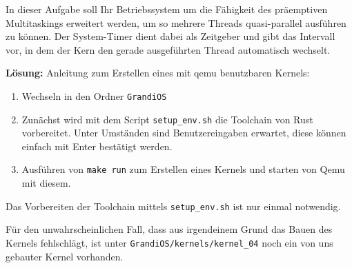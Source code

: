 \begin{description}

In  dieser  Aufgabe  soll  Ihr  Betriebssystem  um  die  Fähigkeit  des  präemptiven  Multitaskings erweitert  werden,  um  so  mehrere  Threads  quasi-parallel  ausführen  zu  können.  Der  System-Timer dient  dabei  als  Zeitgeber  und  gibt  das  Intervall  vor,  in  dem  der  Kern  den  gerade ausgeführten Thread automatisch wechselt. 

\textbf{Lösung:}
Anleitung zum Erstellen eines mit qemu benutzbaren Kernels:
\begin{enumerate}
  \item Wechseln in den Ordner \texttt{GrandiOS}
  \item Zunächst wird mit dem Script \texttt{setup\_env.sh} die Toolchain von Rust vorbereitet. Unter Umständen sind Benutzereingaben erwartet, diese können einfach mit Enter bestätigt werden.
  \item Ausführen von \texttt{make run} zum Erstellen eines Kernels und starten von Qemu mit diesem.
\end{enumerate}
Das Vorbereiten der Toolchain mittels \texttt{setup\_env.sh} ist nur einmal notwendig.

Für den unwahrscheinlichen Fall, dass aus irgendeinem Grund das Bauen des Kernels fehlschlägt, ist unter {\texttt{GrandiOS/kernels/kernel\_04}} noch ein von uns gebauter Kernel vorhanden.


\end{description}
